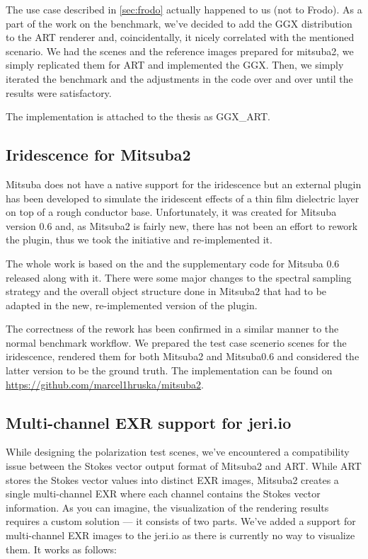 The use case described in \autoref{sec:frodo} actually happened to us (not to Frodo). As a part of the work on the benchmark, we've decided to add the GGX distribution to the ART renderer and, coincidentally, it nicely correlated with the mentioned scenario. We had the scenes and the reference images prepared for mitsuba2, we simply replicated them for ART and implemented the GGX. Then, we simply iterated the benchmark and the adjustments in the code over and over until the results were satisfactory.

The implementation is attached to the thesis as GGX\_ART.

\subsection{Iridescence for Mitsuba2}

Mitsuba does not have a native support for the iridescence but an external plugin has been developed to simulate the iridescent effects of a thin film dielectric layer on top of a rough conductor base. Unfortunately, it was created for Mitsuba version 0.6 and, as Mitsuba2 is fairly new, there has not been an effort to rework the plugin, thus we took the initiative and re-implemented it.

The whole work is based on the \citet{belcour2017practical} and the supplementary code for Mitsuba 0.6 released along with it.
There were some major changes to the spectral sampling strategy and the overall object structure done in Mitsuba2 that had to be adapted in the new, re-implemented version of the plugin.

The correctness of the rework has been confirmed in a similar manner to the normal benchmark workflow. We prepared the test case scenerio scenes for the iridescence, rendered them for both Mitsuba2 and Mitsuba0.6 and considered the latter version to be the ground truth. The implementation can be found on \url{https://github.com/marcel1hruska/mitsuba2}.

\subsection{Multi-channel EXR support for jeri.io}

While designing the polarization test scenes, we've encountered a compatibility issue between the Stokes vector output format of Mitsuba2 and ART. While ART stores the Stokes vector values into distinct EXR images, Mitsuba2 creates a single multi-channel EXR where each channel contains the Stokes vector information. As you can imagine, the visualization of the rendering results requires a custom solution --- it consists of two parts. We've added a support for multi-channel EXR images to the jeri.io as there is currently no way to visualize them. It works as follows:

